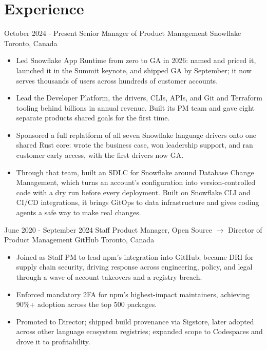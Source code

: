 \documentclass[10pt,a4paper,sans]{moderncv}   %
\begin{document}
\makecvtitle

\vspace{-0.8em}
\section{Experience}

\cventry
  {October 2024 - Present}
  {Senior Manager of Product Management}
  {Snowflake}
  {Toronto, Canada}{}
  {
    \vspace{0.5em}
    \begin{itemize}
      \item Led Snowflake App Runtime from zero to GA in 2026: named and priced it, launched it in the Summit keynote, and shipped GA by September; it now serves thousands of users across hundreds of customer accounts.
      \item Lead the Developer Platform, the drivers, CLIs, APIs, and Git and Terraform tooling behind billions in annual revenue. Built its PM team and gave eight separate products shared goals for the first time.
      \item Sponsored a full replatform of all seven Snowflake language drivers onto one shared Rust core: wrote the business case, won leadership support, and ran customer early access, with the first drivers now GA.
      \item Through that team, built an SDLC for Snowflake around Database Change Management, which turns an account's configuration into version-controlled code with a dry run before every deployment. Built on Snowflake CLI and CI/CD integrations, it brings GitOps to data infrastructure and gives coding agents a safe way to make real changes.
    \end{itemize}
    \vspace{0.5em}
  }

\cventry
  {June 2020 - September 2024}
  {Staff Product Manager, Open Source $\rightarrow$ Director of Product Management}
  {GitHub}
  {Toronto, Canada}{}
  {
    \vspace{0.5em}
    \begin{itemize}
      \item Joined as Staff PM to lead npm's integration into GitHub; became DRI for supply chain security, driving response across engineering, policy, and legal through a wave of account takeovers and a registry breach.
      \item Enforced mandatory 2FA for npm's highest-impact maintainers, achieving 90\%+ adoption across the top 500 packages.
      \item Promoted to Director; shipped build provenance via Sigstore, later adopted across other language ecosystem registries; expanded scope to Codespaces and drove it to profitability.
    \end{itemize}
    \vspace{0.5em}
  }
\end{document}
